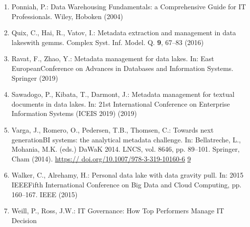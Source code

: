 \documentclass[a4paper,12pt,notitlepage,twoside,openright]{article}
\begin{document}
\begin{enumerate}
\item
  Ponniah, P.: Data Warehousing Fundamentals: a Comprehensive Guide for
  IT Professionals. Wiley, Hoboken (2004)
\item
  Quix, C., Hai, R., Vatov, I.: Metadata extraction and management in
  data lakeswith gemms. Complex Syst. Inf. Model. Q. \textbf{9}, 67--83
  (2016)
\item
  Ravat, F., Zhao, Y.: Metadata management for data lakes. In: East
  EuropeanConference on Advances in Databases and Information Systems.
  Springer (2019)
\item
  Sawadogo, P., Kibata, T., Darmont, J.: Metadata management for textual
  documents in data lakes. In: 21st International Conference on
  Enterprise Information Systems (ICEIS 2019) (2019)
\item
  Varga, J., Romero, O., Pedersen, T.B., Thomsen, C.: Towards next
  generationBI systems: the analytical metadata challenge. In:
  Bellatreche, L., Mohania, M.K. (eds.) DaWaK 2014. LNCS, vol. 8646, pp.
  89--101. Springer, Cham (2014).
  \href{https://doi.org/10.1007/978-3-319-10160-6_9}{https://
  doi.org/10.1007/978-3-319-10160-6}
  \href{https://doi.org/10.1007/978-3-319-10160-6_9}{9}
\item
  Walker, C., Alrehamy, H.: Personal data lake with data gravity pull.
  In: 2015 IEEEFifth International Conference on Big Data and Cloud
  Computing, pp. 160--167. IEEE (2015)
\item
  Weill, P., Ross, J.W.: IT Governance: How Top Performers Manage IT
  Decision
\end{enumerate}
\end{document}

